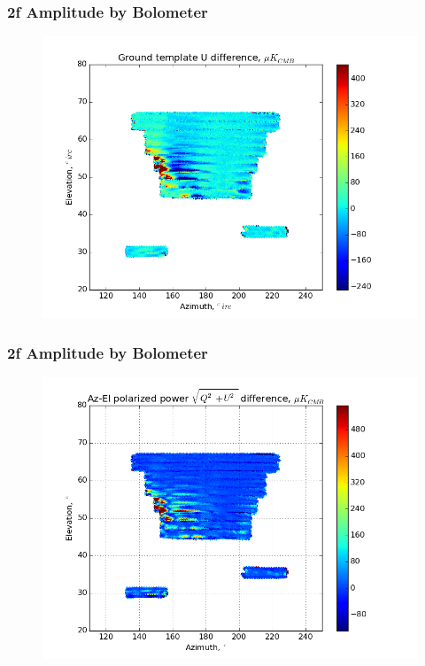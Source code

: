 \documentclass{beamer}
\begin{document}
\begin{frame}
\frametitle{2f Amplitude by Bolometer}
\begin{figure}
\includegraphics[width=0.9\linewidth]{dU_gt_AMP_2F_BY_BOLO.png}
\end{figure}
\end{frame}

\begin{frame}
\frametitle{2f Amplitude by Bolometer}
\begin{figure}
\includegraphics[width=0.9\linewidth]{dMag_gt_AMP_2F_BY_BOLO.png}
\end{figure}
\end{frame}
\end{document}
